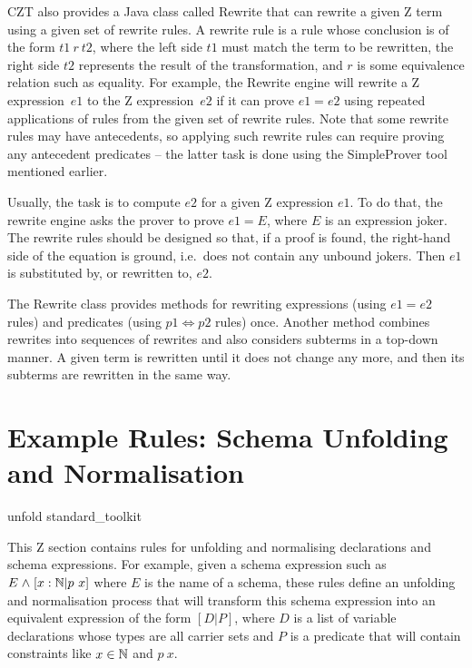 \documentclass{entcs}
\begin{document}
CZT also provides a Java class called Rewrite that can rewrite a given
Z term using a given set of rewrite rules.  A rewrite rule is a rule
whose conclusion is of the form $t1~r~t2$, where the left side $t1$
must match the term to be rewritten, the right side $t2$ represents
the result of the transformation, and $r$ is some equivalence relation
such as equality.  For example, the Rewrite engine will rewrite a Z
expression~$e1$ to the Z expression~$e2$ if it can prove $e1 = e2$
using repeated applications of rules from the given set of rewrite
rules.  Note that some rewrite rules may have antecedents, so applying
such rewrite rules can require proving any antecedent predicates --
the latter task is done using the SimpleProver tool mentioned earlier.

Usually, the task is to compute $e2$ for a given Z expression $e1$.
To do that, the rewrite engine asks the prover to prove $e1 = E$,
where $E$ is an expression joker.  The rewrite rules should be
designed so that, if a proof is found, the right-hand side of the
equation is ground, i.e.\ does not contain any unbound jokers.  Then
$e1$ is substituted by, or rewritten to, $e2$.

The Rewrite class provides methods for rewriting expressions (using $e1 =
e2$ rules) and predicates (using $p1 \iff p2$ rules) once.
Another method combines rewrites into sequences of rewrites and also
considers subterms in a top-down manner.  A given term is rewritten
until it does not change any more, and then its subterms are rewritten
in the same way.

\section{Example Rules: Schema Unfolding and Normalisation} \label{sec:schemas}

\begin{zsection}
  \SECTION unfold \parents standard\_toolkit
\end{zsection}

This Z section contains rules for unfolding and normalising declarations
and schema expressions.  For example, given a schema expression such as $E
\mathrel{\mathstrut{\wedge}} [x:{\mathbb N} | p~x]$ where $E$ is the name of a schema, these rules define
an unfolding and normalisation process that will transform this schema
expression into an equivalent expression of the form $[D|P]$, where $D$ is
a list of variable declarations whose types are all carrier sets and $P$ is
a predicate that will contain constraints like $x \in {\mathbb N}$ and $p~x$.
\end{document}
